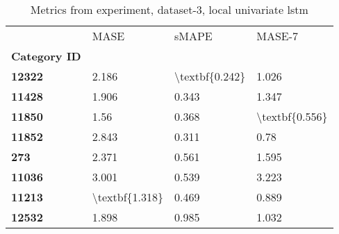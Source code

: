 \begin{table}[h]
\centering
\caption{Metrics from experiment, dataset-3, local univariate lstm}
\label{table:local-univariate-lstm-dataset-3}
\begin{tabular}{llll}
\toprule
{} &            MASE &           sMAPE &          MASE-7 \\
\textbf{Category ID} &                 &                 &                 \\
\midrule
\textbf{12322      } &           2.186 &  \textbackslash textbf\{0.242\} &           1.026 \\
\textbf{11428      } &           1.906 &           0.343 &           1.347 \\
\textbf{11850      } &            1.56 &           0.368 &  \textbackslash textbf\{0.556\} \\
\textbf{11852      } &           2.843 &           0.311 &            0.78 \\
\textbf{273        } &           2.371 &           0.561 &           1.595 \\
\textbf{11036      } &           3.001 &           0.539 &           3.223 \\
\textbf{11213      } &  \textbackslash textbf\{1.318\} &           0.469 &           0.889 \\
\textbf{12532      } &           1.898 &           0.985 &           1.032 \\
\bottomrule
\end{tabular}
\end{table}
